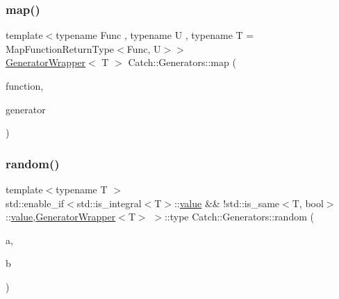 \mbox{\label{namespace_catch_1_1_generators_af33fd06c51ac9173c3bee2ddee2559a6}} 
\subsubsection{\texorpdfstring{map()}{map()}}
{\footnotesize\ttfamily template$<$typename Func , typename U , typename T  = Map\+Function\+Return\+Type$<$\+Func, U$>$$>$ \\
\mbox{\hyperlink{class_catch_1_1_generators_1_1_generator_wrapper}{Generator\+Wrapper}}$<$ T $>$ Catch\+::\+Generators\+::map (\begin{DoxyParamCaption}\item[{Func \&\&}]{function,  }\item[{\mbox{\hyperlink{class_catch_1_1_generators_1_1_generator_wrapper}{Generator\+Wrapper}}$<$ U $>$ \&\&}]{generator }\end{DoxyParamCaption})}

\mbox{\label{namespace_catch_1_1_generators_a5003f0b96aaa4b1a53ebd81f4e93ab0c}} 
\subsubsection{\texorpdfstring{random()}{random()}\hspace{0.1cm}{\footnotesize\ttfamily [1/2]}}
{\footnotesize\ttfamily template$<$typename T $>$ \\
std\+::enable\+\_\+if$<$std\+::is\+\_\+integral$<$T$>$\+::\mbox{\hyperlink{namespace_catch_1_1_generators_a3c4989dd0dca44455f55484cedaa18da}{value}} \&\& !std\+::is\+\_\+same$<$T, bool$>$\+::\mbox{\hyperlink{namespace_catch_1_1_generators_a3c4989dd0dca44455f55484cedaa18da}{value}},\mbox{\hyperlink{class_catch_1_1_generators_1_1_generator_wrapper}{Generator\+Wrapper}}$<$T$>$ $>$\+::type Catch\+::\+Generators\+::random (\begin{DoxyParamCaption}\item[{T}]{a,  }\item[{T}]{b }\end{DoxyParamCaption})}

\mbox{\label{namespace_catch_1_1_generators_a677b543146adcdfe23fdfff48007a57e}} 
